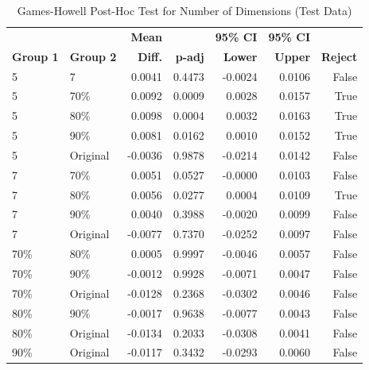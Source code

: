 \begin{table}[!htbp]
    \captionsetup{skip=5pt}
\centering
\caption{Games-Howell Post-Hoc Test for Number of Dimensions (Test Data)}
\label{tbl:games_howell_num_dim}
        \begin{tabular}{llrrrrr}
            \toprule
             &  & \textbf{Mean} &  & \textbf{95\% CI} & \textbf{95\% CI} & \\
            \textbf{Group 1} & \textbf{Group 2} & \textbf{Diff.} & \textbf{p-adj} & \textbf{Lower} & \textbf{Upper} & \textbf{Reject}\\
\midrule
5 & 7 & 0.0041 & 0.4473 & -0.0024 & 0.0106 & False \\
5 & 70\% & 0.0092 & 0.0009 & 0.0028 & 0.0157 & True \\
5 & 80\% & 0.0098 & 0.0004 & 0.0032 & 0.0163 & True \\
5 & 90\% & 0.0081 & 0.0162 & 0.0010 & 0.0152 & True \\
5 & Original & -0.0036 & 0.9878 & -0.0214 & 0.0142 & False \\
7 & 70\% & 0.0051 & 0.0527 & -0.0000 & 0.0103 & False \\
7 & 80\% & 0.0056 & 0.0277 & 0.0004 & 0.0109 & True \\
7 & 90\% & 0.0040 & 0.3988 & -0.0020 & 0.0099 & False \\
7 & Original & -0.0077 & 0.7370 & -0.0252 & 0.0097 & False \\
70\% & 80\% & 0.0005 & 0.9997 & -0.0046 & 0.0057 & False \\
70\% & 90\% & -0.0012 & 0.9928 & -0.0071 & 0.0047 & False \\
70\% & Original & -0.0128 & 0.2368 & -0.0302 & 0.0046 & False \\
80\% & 90\% & -0.0017 & 0.9638 & -0.0077 & 0.0043 & False \\
80\% & Original & -0.0134 & 0.2033 & -0.0308 & 0.0041 & False \\
90\% & Original & -0.0117 & 0.3432 & -0.0293 & 0.0060 & False \\
\bottomrule
\end{tabular}
\end{table}

